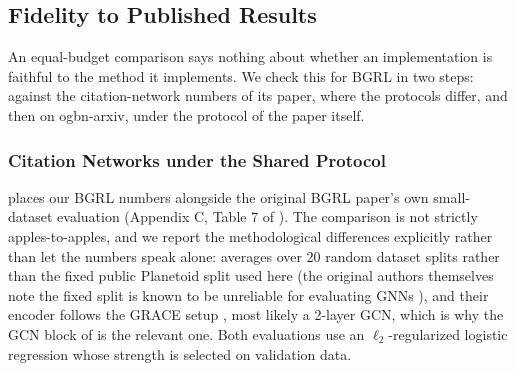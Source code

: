 \documentclass[conference]{IEEEtran}
\begin{document}
\subsection{Fidelity to Published Results}
\label{sec:results-fidelity}
An equal-budget comparison says nothing about whether an implementation is faithful to the method it implements. We check this for BGRL in two steps: against the citation-network numbers of its paper, where the protocols differ, and then on ogbn-arxiv, under the protocol of the paper itself.

\subsubsection{Citation Networks under the Shared Protocol}
 places our BGRL numbers alongside the original BGRL paper's own small-dataset evaluation (Appendix C, Table 7 of \cite{bgrl}). The comparison is not strictly apples-to-apples, and we report the methodological differences explicitly rather than let the numbers speak alone: \cite{bgrl} averages over 20 random dataset splits rather than the fixed public Planetoid split used here (the original authors themselves note the fixed split is known to be unreliable for evaluating GNNs \cite{shchur2018pitfalls}), and their encoder follows the GRACE setup \cite{zhu2020graph}, most likely a 2-layer GCN, which is why the GCN block of  is the relevant one. Both evaluations use an $\ell_2$-regularized logistic regression whose strength is selected on validation data.

\begin{table}[htbp]
\centering
\caption{Test Accuracy (\%): our BGRL runs (public split, shared untuned protocol, 300 steps) vs.\ the original BGRL paper's small-dataset evaluation (20 random splits, GRACE-style encoder)}
\label{tab:bgrl-comparison}
\footnotesize
{}
\end{table}
\end{document}
